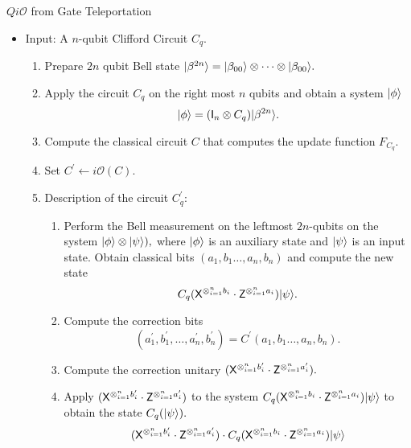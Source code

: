 \begin{algorithm}[]
\label{QiO:Clifford-teleportation}
   \caption{$Qi\mathcal{O}$ from Gate Teleportation}
  \begin{itemize}
  \item Input: A $n$-qubit Clifford Circuit $C_q.$
  \begin{enumerate}
  \item Prepare $2n$ qubit Bell state ${\lvert}\beta^{ 2n}\rangle={\lvert}\beta_{00}\rangle\otimes \cdots \otimes {\lvert}\beta_{00}\rangle.$
  \item Apply the circuit $C_q$ on the right most $n$ qubits and obtain a system ${\lvert}\phi\rangle$
  										 $${\lvert}\phi\rangle=({\sf I}_n\otimes C_q) {\lvert}\beta^{2n}\rangle.$$
 \item Compute the classical circuit $C$ that computes the update function $F_{C_q}.$	
 \item Set $C^\prime\leftarrow i\mathcal{O}(C).$							
  \item Description of the circuit  $C_q^\prime:$
    \begin{enumerate}
     \item  Perform the Bell measurement on the leftmost $2n$-qubits on the system ${\lvert}\phi\rangle\otimes {\lvert}\psi\rangle),$ where ${\lvert}\phi\rangle$ is an auxiliary state and ${\lvert}\psi\rangle$ is an input state. Obtain classical bits $(a_1,b_1\ldots,a_n,b_n)$ and compute the new state
     \begin{equation}
     \label{eq:last}
      C_q({\sf X}^{\otimes_{i=1}^{n} b_{i}} \cdot {\sf Z}^{\otimes_{i=1}^{n} a_{i}}){\lvert}\psi\rangle.
      \end{equation}
     \item Compute the correction bits
      \begin{equation}
     \label{eq:last1}
  (a_1^\prime, b_1^\prime,\ldots, a_n^\prime, b_n^\prime)=C^\prime(a_1,b_1\ldots,a_n,b_n).
  \end{equation}
     \item Compute the correction unitary $({\sf X}^{\otimes_{i=1}^{n} b_{i}^\prime} \cdot {\sf Z}^{\otimes_{i=1}^{n} a_{i}^\prime}).$
     \item Apply  $({\sf X}^{\otimes_{i=1}^{n} b_{i}^\prime} \cdot {\sf Z}^{\otimes_{i=1}^{n} a_{i}^\prime})$ to the system $C_q({\sf X}^{\otimes_{i=1}^{n} b_{i}} \cdot {\sf Z}^{\otimes_{i=1}^{n} a_{i}}){\lvert}\psi\rangle$ to obtain the state $C_q({\lvert}\psi\rangle).$
     \begin{equation*}
  \begin{aligned}
 (\xgate^{\otimes_{i=1}^{n} b_{i}^\prime} \cdot \zgate^{\otimes_{i=1}^{n} a_{i}^\prime}) \cdot C_q(\xgate^{\otimes_{i=1}^{n} b_{i}} \cdot \zgate^{\otimes_{i=1}^{n}a_{i}})\ket{\psi}\\

\end{aligned}
\end{equation*}
\end{enumerate}
\end{enumerate}
\end{itemize}
\end{algorithm}
